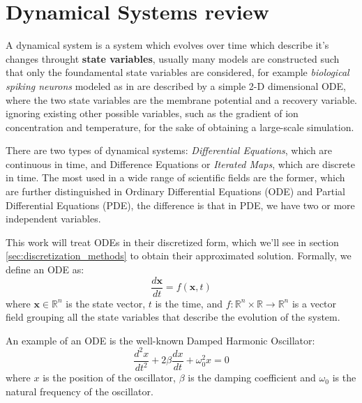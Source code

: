 \section{Dynamical Systems review}
A dynamical system is a system which evolves over time which describe it's changes throught \textbf{state variables}, usually many models are constructed such that
only the foundamental state variables are considered, for example \textit{biological spiking neurons} modeled as in \cite{1257420} are described by a simple 2-D dimensional ODE, where the two state variables are the membrane potential and a recovery variable.
ignoring existing other possible variables, such as the gradient of ion concentration and temperature, for the sake of obtaining a large-scale simulation.\newline

There are two types of dynamical systems: \textit{Differential Equations}, which are continuous in time,
and Difference Equations or \textit{Iterated Maps}, which are discrete in time. 
The most used in a wide range of scientific fields are the former, which are further distinguished in Ordinary Differential Equations (ODE) 
and Partial Differential Equations (PDE), the difference is that in PDE, we have two or more independent variables.  \newline

This work will treat ODEs in their discretized form, which we'll see in section \ref{sec:discretization_methods} to obtain their approximated solution.\newline
 Formally, we define an ODE as:
\begin{equation}
    \frac{d\mathbf{x}}{dt} = f(\mathbf{x},t)
    \label{eq:ode}
\end{equation}
where $\mathbf{x} \in \mathbb{R}^n$ is the state vector, $t$ is the time, and $f:\mathbb{R}^n \times \mathbb{R} \rightarrow \mathbb{R}^n$ is a
vector field grouping all the state variables that describe the evolution of the system. \newline


An example of an ODE is the well-known Damped Harmonic Oscillator:
\begin{equation} \label{eq:armonic}
    \frac{d^2x}{dt^2} + 2\beta \frac{dx}{dt} + \omega_0^2 x = 0
\end{equation}
where $x$ is the position of the oscillator, $\beta$ is the damping coefficient and $\omega_0$ is the natural frequency of the oscillator.


